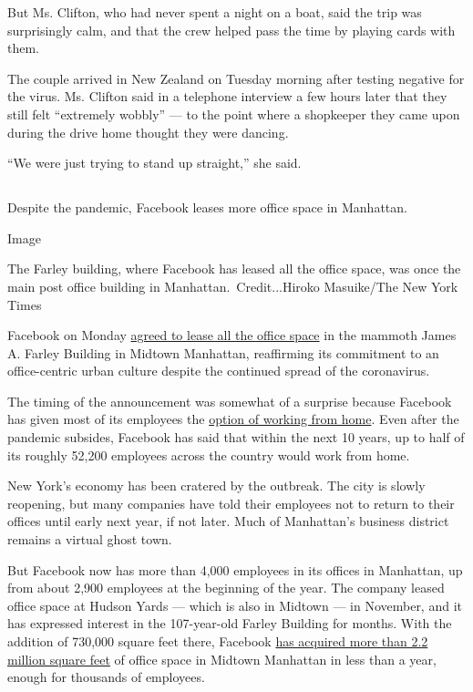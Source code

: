 But Ms. Clifton, who had never spent a night on a boat, said the trip
was surprisingly calm, and that the crew helped pass the time by playing
cards with them.

The couple arrived in New Zealand on Tuesday morning after testing
negative for the virus. Ms. Clifton said in a telephone interview a few
hours later that they still felt ``extremely wobbly'' --- to the point
where a shopkeeper they came upon during the drive home thought they
were dancing.

``We were just trying to stand up straight,'' she said.

\hypertarget{-7}{%
\subsection{}\label{-7}}

Despite the pandemic, Facebook leases more office space in Manhattan.

Image

The Farley building, where Facebook has leased all the office space, was
once the main post office building in Manhattan.~Credit...Hiroko
Masuike/The New York Times

Facebook on Monday
\href{https://www.nytimes3xbfgragh.onion/2020/08/03/nyregion/facebook-nyc-office-farley-building.html}{agreed
to lease all the office space} in the mammoth James A. Farley Building
in Midtown Manhattan, reaffirming its commitment to an office-centric
urban culture despite the continued spread of the coronavirus.

The timing of the announcement was somewhat of a surprise because
Facebook has given most of its employees the
\href{https://www.nytimes3xbfgragh.onion/2020/05/21/technology/facebook-remote-work-coronavirus.html}{option
of working from home}. Even after the pandemic subsides, Facebook has
said that within the next 10 years, up to half of its roughly 52,200
employees across the country would work from home.

New York's economy has been cratered by the outbreak. The city is slowly
reopening, but many companies have told their employees not to return to
their offices until early next year, if not later. Much of Manhattan's
business district remains a virtual ghost town.

But Facebook now has more than 4,000 employees in its offices in
Manhattan, up from about 2,900 employees at the beginning of the year.
The company leased office space at Hudson Yards --- which is also in
Midtown --- in November, and it has expressed interest in the
107-year-old Farley Building for months. With the addition of 730,000
square feet there, Facebook
\href{https://www.nytimes3xbfgragh.onion/2020/01/05/nyregion/nyc-tech-facebook-amazon-google.html}{has
acquired more than 2.2 million square feet} of office space in Midtown
Manhattan in less than a year, enough for thousands of employees.

